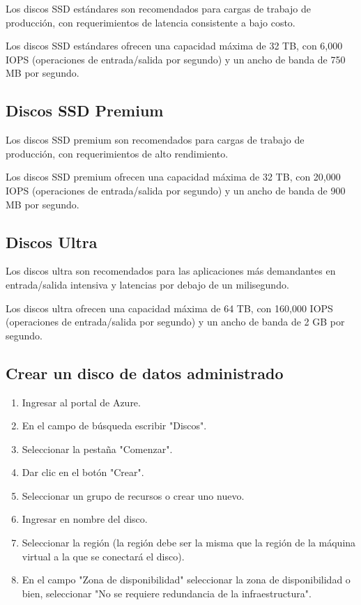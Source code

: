 Los discos SSD estándares son recomendados para cargas de trabajo de producción, con requerimientos de latencia consistente a bajo costo.

Los discos SSD estándares ofrecen una capacidad máxima de 32 TB, con 6,000 IOPS (operaciones de entrada/salida por segundo) y un ancho de banda de 750 MB por segundo.

\subsection{Discos SSD Premium}

Los discos SSD premium son recomendados para cargas de trabajo de producción, con requerimientos de alto rendimiento.

Los discos SSD premium ofrecen una capacidad máxima de 32 TB, con 20,000 IOPS (operaciones de entrada/salida por segundo) y un ancho de banda de 900 MB por segundo.

\subsection{Discos Ultra}

Los discos ultra son recomendados para las aplicaciones más demandantes en entrada/salida intensiva y latencias por debajo de un milisegundo.

Los discos ultra ofrecen una capacidad máxima de 64 TB, con 160,000 IOPS (operaciones de entrada/salida por segundo) y un ancho de banda de 2 GB por segundo.

\subsection{Crear un disco de datos administrado}

\begin{enumerate}
\item Ingresar al portal de Azure.
\item En el campo de búsqueda escribir "Discos".
\item Seleccionar la pestaña "Comenzar".
\item Dar clic en el botón "Crear".
\item Seleccionar un grupo de recursos o crear uno nuevo.
\item Ingresar en nombre del disco.
\item Seleccionar la región (la región debe ser la misma que la región de la máquina virtual a la que se conectará el disco).
\item En el campo "Zona de disponibilidad" seleccionar la zona de disponibilidad o bien, seleccionar "No se requiere redundancia de la infraestructura".
\end{enumerate}

